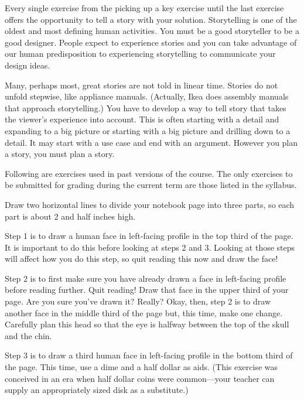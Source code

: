 Every single exercise from the picking up a key exercise until the last
exercise offers the opportunity to tell a story with your solution.
Storytelling is one of the oldest and most defining human activities.
You must be a good storyteller to be a good designer. People expect to
experience stories and you can take advantage of our human
predisposition to experiencing storytelling to communicate your design
ideas.

Many, perhaps most, great stories are not told in linear time. Stories
do not unfold stepwise, like appliance manuals. (Actually, Ikea does
assembly manuals that approach storytelling.) You have to develop a way
to tell story that takes the viewer's experience into account. This is
often starting with a detail and expanding to a big picture or starting
with a big picture and drilling down to a detail. It may start with a
use case and end with an argument. However you plan a story, you must
plan a story.

\hypertarget{exercise-list}{%
\label{exercise-list}}

Following are exercises used in past versions of the course. The only
exercises to be submitted for grading during the current term are those
listed in the syllabus.

\hypertarget{draw-a-face}{%
\label{draw-a-face}}

Draw two horizontal lines to divide your notebook page into three parts,
so each part is about 2 and half inches high.

Step 1 is to draw a human face in left-facing profile in the top third
of the page. It is important to do this before looking at steps 2 and 3.
Looking at those steps will affect how you do this step, so quit reading
this now and draw the face!

Step 2 is to first make sure you have already drawn a face in
left-facing profile before reading further. Quit reading! Draw that face
in the upper third of your page. Are you sure you've drawn it? Really?
Okay, then, step 2 is to draw another face in the middle third of the
page but, this time, make one change. Carefully plan this head so that
the eye is halfway between the top of the skull and the chin.

Step 3 is to draw a third human face in left-facing profile in the
bottom third of the page. This time, use a dime and a half dollar as
aids. (This exercise was conceived in an era when half dollar coins were
common---your teacher can supply an appropriately sized disk as a
substitute.)

